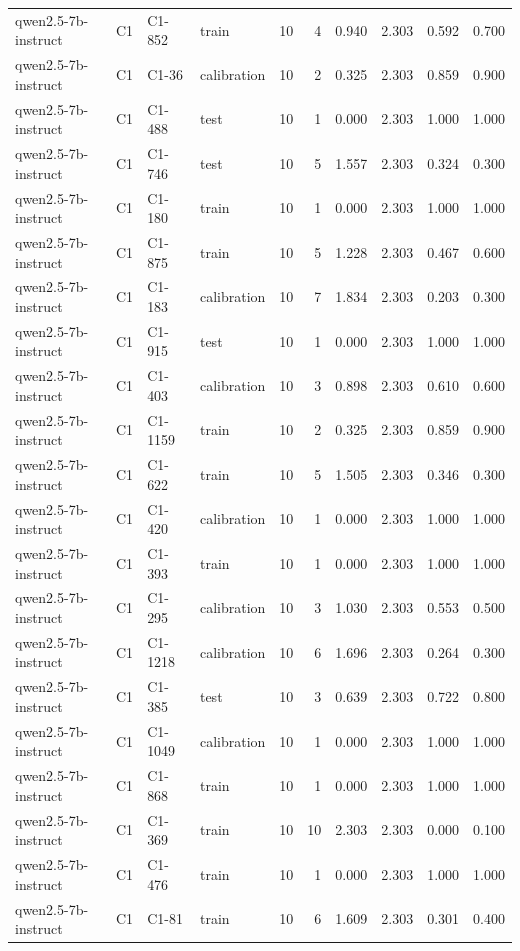\begin{table}
\begin{tabular}{llllrrrrrr}
qwen2.5-7b-instruct & C1 & C1-852 & train & 10 & 4 & 0.940 & 2.303 & 0.592 & 0.700 \\
qwen2.5-7b-instruct & C1 & C1-36 & calibration & 10 & 2 & 0.325 & 2.303 & 0.859 & 0.900 \\
qwen2.5-7b-instruct & C1 & C1-488 & test & 10 & 1 & 0.000 & 2.303 & 1.000 & 1.000 \\
qwen2.5-7b-instruct & C1 & C1-746 & test & 10 & 5 & 1.557 & 2.303 & 0.324 & 0.300 \\
qwen2.5-7b-instruct & C1 & C1-180 & train & 10 & 1 & 0.000 & 2.303 & 1.000 & 1.000 \\
qwen2.5-7b-instruct & C1 & C1-875 & train & 10 & 5 & 1.228 & 2.303 & 0.467 & 0.600 \\
qwen2.5-7b-instruct & C1 & C1-183 & calibration & 10 & 7 & 1.834 & 2.303 & 0.203 & 0.300 \\
qwen2.5-7b-instruct & C1 & C1-915 & test & 10 & 1 & 0.000 & 2.303 & 1.000 & 1.000 \\
qwen2.5-7b-instruct & C1 & C1-403 & calibration & 10 & 3 & 0.898 & 2.303 & 0.610 & 0.600 \\
qwen2.5-7b-instruct & C1 & C1-1159 & train & 10 & 2 & 0.325 & 2.303 & 0.859 & 0.900 \\
qwen2.5-7b-instruct & C1 & C1-622 & train & 10 & 5 & 1.505 & 2.303 & 0.346 & 0.300 \\
qwen2.5-7b-instruct & C1 & C1-420 & calibration & 10 & 1 & 0.000 & 2.303 & 1.000 & 1.000 \\
qwen2.5-7b-instruct & C1 & C1-393 & train & 10 & 1 & 0.000 & 2.303 & 1.000 & 1.000 \\
qwen2.5-7b-instruct & C1 & C1-295 & calibration & 10 & 3 & 1.030 & 2.303 & 0.553 & 0.500 \\
qwen2.5-7b-instruct & C1 & C1-1218 & calibration & 10 & 6 & 1.696 & 2.303 & 0.264 & 0.300 \\
qwen2.5-7b-instruct & C1 & C1-385 & test & 10 & 3 & 0.639 & 2.303 & 0.722 & 0.800 \\
qwen2.5-7b-instruct & C1 & C1-1049 & calibration & 10 & 1 & 0.000 & 2.303 & 1.000 & 1.000 \\
qwen2.5-7b-instruct & C1 & C1-868 & train & 10 & 1 & 0.000 & 2.303 & 1.000 & 1.000 \\
qwen2.5-7b-instruct & C1 & C1-369 & train & 10 & 10 & 2.303 & 2.303 & 0.000 & 0.100 \\
qwen2.5-7b-instruct & C1 & C1-476 & train & 10 & 1 & 0.000 & 2.303 & 1.000 & 1.000 \\
qwen2.5-7b-instruct & C1 & C1-81 & train & 10 & 6 & 1.609 & 2.303 & 0.301 & 0.400 \\

\end{tabular}
\end{table}

